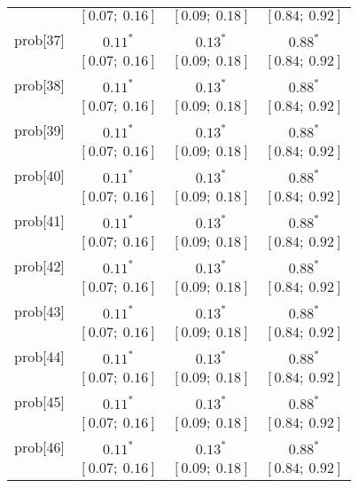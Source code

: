 \begin{table}
\begin{center}
\begin{tabular}{l c c c }
          & $[0.07;\ 0.16]$         & $[0.09;\ 0.18]$         & $[0.84;\ 0.92]$       \\
prob[37]  & $0.11^{*}$              & $0.13^{*}$              & $0.88^{*}$            \\
          & $[0.07;\ 0.16]$         & $[0.09;\ 0.18]$         & $[0.84;\ 0.92]$       \\
prob[38]  & $0.11^{*}$              & $0.13^{*}$              & $0.88^{*}$            \\
          & $[0.07;\ 0.16]$         & $[0.09;\ 0.18]$         & $[0.84;\ 0.92]$       \\
prob[39]  & $0.11^{*}$              & $0.13^{*}$              & $0.88^{*}$            \\
          & $[0.07;\ 0.16]$         & $[0.09;\ 0.18]$         & $[0.84;\ 0.92]$       \\
prob[40]  & $0.11^{*}$              & $0.13^{*}$              & $0.88^{*}$            \\
          & $[0.07;\ 0.16]$         & $[0.09;\ 0.18]$         & $[0.84;\ 0.92]$       \\
prob[41]  & $0.11^{*}$              & $0.13^{*}$              & $0.88^{*}$            \\
          & $[0.07;\ 0.16]$         & $[0.09;\ 0.18]$         & $[0.84;\ 0.92]$       \\
prob[42]  & $0.11^{*}$              & $0.13^{*}$              & $0.88^{*}$            \\
          & $[0.07;\ 0.16]$         & $[0.09;\ 0.18]$         & $[0.84;\ 0.92]$       \\
prob[43]  & $0.11^{*}$              & $0.13^{*}$              & $0.88^{*}$            \\
          & $[0.07;\ 0.16]$         & $[0.09;\ 0.18]$         & $[0.84;\ 0.92]$       \\
prob[44]  & $0.11^{*}$              & $0.13^{*}$              & $0.88^{*}$            \\
          & $[0.07;\ 0.16]$         & $[0.09;\ 0.18]$         & $[0.84;\ 0.92]$       \\
prob[45]  & $0.11^{*}$              & $0.13^{*}$              & $0.88^{*}$            \\
          & $[0.07;\ 0.16]$         & $[0.09;\ 0.18]$         & $[0.84;\ 0.92]$       \\
prob[46]  & $0.11^{*}$              & $0.13^{*}$              & $0.88^{*}$            \\
          & $[0.07;\ 0.16]$         & $[0.09;\ 0.18]$         & $[0.84;\ 0.92]$       \\

\end{tabular}
\end{center}
\end{table}
